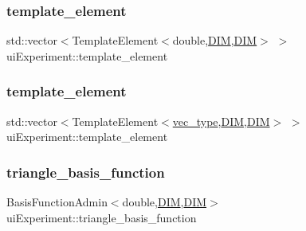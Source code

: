 \subsubsection{\texorpdfstring{template\+\_\+element}{template\_element}\hspace{0.1cm}{\footnotesize\ttfamily [1/2]}}
{\footnotesize\ttfamily std\+::vector$<$Template\+Element$<$double,\mbox{\hyperlink{complex__node___t_h_f_e_m_2uiexp_8h_a589b8b9bfdf714f736059845d568b597}{D\+IM}},\mbox{\hyperlink{complex__node___t_h_f_e_m_2uiexp_8h_a589b8b9bfdf714f736059845d568b597}{D\+IM}}$>$ $>$ ui\+Experiment\+::template\+\_\+element\hspace{0.3cm}{\ttfamily [private]}}

\mbox{\label{classui_experiment_a9716ddbac22d7311f919fe55991e8930}} 
\subsubsection{\texorpdfstring{template\+\_\+element}{template\_element}\hspace{0.1cm}{\footnotesize\ttfamily [2/2]}}
{\footnotesize\ttfamily std\+::vector$<$Template\+Element$<$\mbox{\hyperlink{complex__edge___t_h_f_e_m_2emdefs_8h_a0a0de407de54661e0d56aa8686c104d9}{vec\+\_\+type}},\mbox{\hyperlink{complex__node___t_h_f_e_m_2uiexp_8h_a589b8b9bfdf714f736059845d568b597}{D\+IM}},\mbox{\hyperlink{complex__node___t_h_f_e_m_2uiexp_8h_a589b8b9bfdf714f736059845d568b597}{D\+IM}}$>$ $>$ ui\+Experiment\+::template\+\_\+element\hspace{0.3cm}{\ttfamily [private]}}

\mbox{\label{classui_experiment_a9877c48b948d57a73663d4b3a741d6ae}} 
\subsubsection{\texorpdfstring{triangle\+\_\+basis\+\_\+function}{triangle\_basis\_function}\hspace{0.1cm}{\footnotesize\ttfamily [1/2]}}
{\footnotesize\ttfamily Basis\+Function\+Admin$<$double,\mbox{\hyperlink{complex__node___t_h_f_e_m_2uiexp_8h_a589b8b9bfdf714f736059845d568b597}{D\+IM}},\mbox{\hyperlink{complex__node___t_h_f_e_m_2uiexp_8h_a589b8b9bfdf714f736059845d568b597}{D\+IM}}$>$ ui\+Experiment\+::triangle\+\_\+basis\+\_\+function\hspace{0.3cm}{\ttfamily [private]}}

